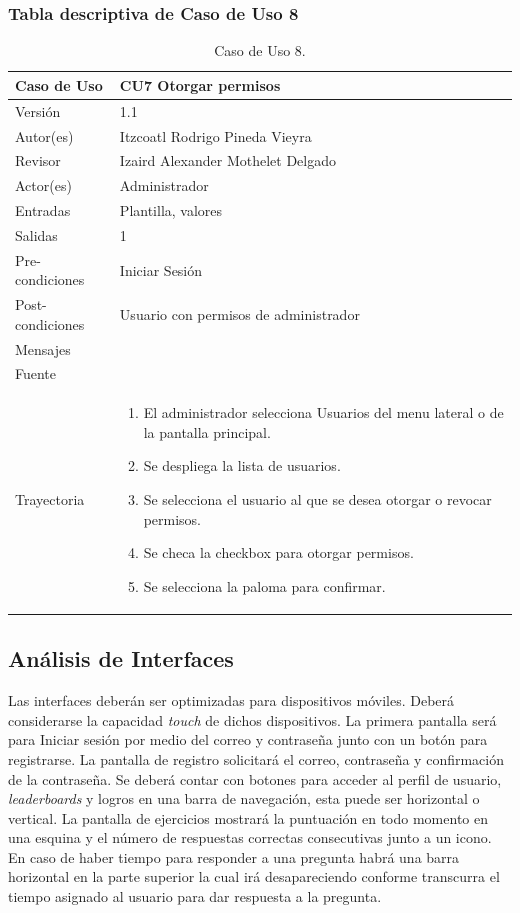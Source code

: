 \documentclass{article}
\begin{document}
\subsubsection{Tabla descriptiva de Caso de Uso 8}
\begin{table}[H]
\caption{Caso de Uso 8.}
\begin{tabular}{|M{4cm}|M{12cm}|}

\hline
Caso de Uso & CU7 Otorgar permisos\\ \hline
Versión & 1.1\\ \hline
Autor(es) & Itzcoatl Rodrigo Pineda Vieyra \\ \hline
Revisor &  Izaird Alexander Mothelet Delgado \\ \hline
Actor(es) & Administrador \\ \hline
Entradas &  Plantilla, valores \\ \hline
Salidas & 1 \\ \hline
Pre-condiciones & Iniciar Sesión  \\ \hline
Post-condiciones & Usuario con permisos de administrador\\ \hline
Mensajes & \\ \hline
Fuente &  \\ \hline	
Trayectoria &

\begin{enumerate}
\item El administrador selecciona Usuarios del menu lateral o de la pantalla principal.
\item Se despliega la lista de usuarios.
\item Se selecciona el usuario al que se desea otorgar o revocar permisos.
\item Se checa la checkbox para otorgar permisos.
\item Se selecciona la paloma para confirmar.
\end{enumerate}
\\ \hline
\end{tabular}

\end{table}


\subsection{Análisis de Interfaces}
Las interfaces deberán ser optimizadas para dispositivos móviles. Deberá considerarse la capacidad \emph{touch} de dichos dispositivos. La primera pantalla será para Iniciar sesión por medio del correo y contraseña junto con un botón para registrarse. La pantalla de registro solicitará el correo, contraseña y confirmación de la contraseña. Se deberá contar con botones para acceder al perfil de usuario, \emph{leaderboards} y logros en una barra de navegación, esta puede ser horizontal o vertical. La pantalla de ejercicios mostrará la puntuación en todo momento en una esquina y el número de respuestas correctas consecutivas junto a un icono. En caso de haber tiempo para responder a una pregunta habrá una barra horizontal en la parte superior la cual irá desapareciendo conforme transcurra el tiempo asignado al usuario para dar respuesta a la pregunta.
\end{document}
